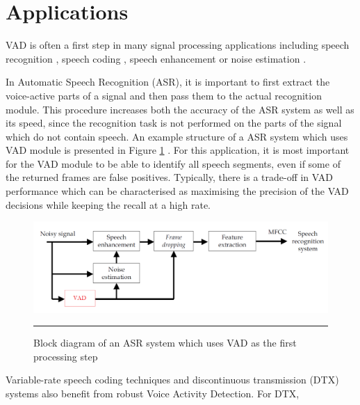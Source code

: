 \section{Applications}

VAD is often a first step in many signal processing applications including speech recognition \cite{RamirezGorriz}, speech coding \cite{Sohn}, speech enhancement \cite{Park} or noise estimation \cite{RamirezGorriz}. \medskip

In Automatic Speech Recognition (ASR), it is important to first extract the voice-active parts of a signal and then pass them to the actual recognition module. This procedure increases both the accuracy of the ASR system as well as its speed, since the recognition task is not performed on the parts of the signal which do not contain speech. An example structure of a ASR system which uses VAD module is presented in Figure \ref{fig:ASRVAD} \cite{RamirezGorriz}. For this application, it is most important for the VAD module to be able to identify all speech segments, even if some of the returned frames are false positives. Typically, there is a trade-off in VAD performance which can be characterised as maximising the precision of the VAD decisions while keeping the recall at a high rate.\medskip

\begin{figure}[htbp]
	\centering
		\includegraphics[width=1\columnwidth]{Figures/ASRVAD.png}
		\rule{34em}{0.5pt}
	\caption[Block diagram of an ASR system which uses VAD as the first processing step]{Block diagram of an ASR system which uses VAD as the first processing step \cite{RamirezGorriz}}
	\label{fig:ASRVAD}
\end{figure}

Variable-rate speech coding techniques and discontinuous transmission (DTX) \cite{GSMControl} systems also benefit from robust Voice Activity Detection. For DTX, 
